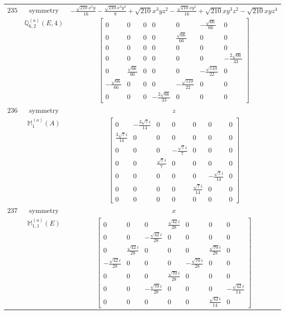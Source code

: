 \documentclass[fleqn,8pt,landscape]{jsarticle}
\begin{document}
\begin{longtable}{ccc}
$ 235 $ & $ \text{symmetry} $ & $ - \frac{\sqrt{210} x^{5} y}{16} - \frac{\sqrt{210} x^{3} y^{3}}{8} + \sqrt{210} x^{3} y z^{2} - \frac{\sqrt{210} x y^{5}}{16} + \sqrt{210} x y^{3} z^{2} - \sqrt{210} x y z^{4} $ \\
$  $ & $ \mathbb{Q}_{6,2}^{(a)}(E,4) $ & $ \begin{bmatrix} 0 & 0 & 0 & 0 & 0 & - \frac{\sqrt{66}}{66} & 0 \\ 0 & 0 & 0 & 0 & \frac{\sqrt{66}}{66} & 0 & 0 \\ 0 & 0 & 0 & 0 & 0 & 0 & 0 \\ 0 & 0 & 0 & 0 & 0 & 0 & - \frac{2 \sqrt{66}}{33} \\ 0 & \frac{\sqrt{66}}{66} & 0 & 0 & 0 & - \frac{\sqrt{110}}{22} & 0 \\ - \frac{\sqrt{66}}{66} & 0 & 0 & 0 & - \frac{\sqrt{110}}{22} & 0 & 0 \\ 0 & 0 & 0 & - \frac{2 \sqrt{66}}{33} & 0 & 0 & 0 \end{bmatrix} $ \\ \hline
$ 236 $ & $ \text{symmetry} $ & $ z $ \\
$  $ & $ \mathbb{M}_{1}^{(a)}(A) $ & $ \begin{bmatrix} 0 & - \frac{3 \sqrt{7} i}{14} & 0 & 0 & 0 & 0 & 0 \\ \frac{3 \sqrt{7} i}{14} & 0 & 0 & 0 & 0 & 0 & 0 \\ 0 & 0 & 0 & - \frac{\sqrt{7} i}{7} & 0 & 0 & 0 \\ 0 & 0 & \frac{\sqrt{7} i}{7} & 0 & 0 & 0 & 0 \\ 0 & 0 & 0 & 0 & 0 & - \frac{\sqrt{7} i}{14} & 0 \\ 0 & 0 & 0 & 0 & \frac{\sqrt{7} i}{14} & 0 & 0 \\ 0 & 0 & 0 & 0 & 0 & 0 & 0 \end{bmatrix} $ \\ \hline
$ 237 $ & $ \text{symmetry} $ & $ x $ \\
$  $ & $ \mathbb{M}_{1,1}^{(a)}(E) $ & $ \begin{bmatrix} 0 & 0 & 0 & \frac{\sqrt{42} i}{28} & 0 & 0 & 0 \\ 0 & 0 & - \frac{\sqrt{42} i}{28} & 0 & 0 & 0 & 0 \\ 0 & \frac{\sqrt{42} i}{28} & 0 & 0 & 0 & \frac{\sqrt{70} i}{28} & 0 \\ - \frac{\sqrt{42} i}{28} & 0 & 0 & 0 & - \frac{\sqrt{70} i}{28} & 0 & 0 \\ 0 & 0 & 0 & \frac{\sqrt{70} i}{28} & 0 & 0 & 0 \\ 0 & 0 & - \frac{\sqrt{70} i}{28} & 0 & 0 & 0 & - \frac{\sqrt{42} i}{14} \\ 0 & 0 & 0 & 0 & 0 & \frac{\sqrt{42} i}{14} & 0 \end{bmatrix} $ \\ \hline

\end{longtable}
\end{document}

